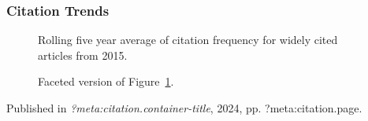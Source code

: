 \documentclass[
  10pt,
  letterpaper,
  DIV=11,
  numbers=noendperiod,
  twoside]{scrartcl}
\begin{document}
\subsubsection*{Citation Trends}\label{citation-trends-39}

\begin{figure}


\caption{\label{fig-citation-spaghetti-2015}Rolling five year average of
citation frequency for widely cited articles from 2015.}

\end{figure}%

\begin{figure}


\caption{\label{fig-citation-facet-2015}Faceted version of
Figure~\ref{fig-citation-spaghetti-2015}.}

\end{figure}%

\newpage



\noindent Published in\emph{
?meta:citation.container-title}, 2024, pp. ?meta:citation.page.
\end{document}
